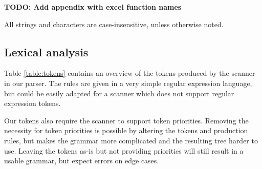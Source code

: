 \documentclass[conference]{IEEEtran}
\newcommand{\todo}[1]{\textbf{TODO: #1}}
\begin{document}
\todo{Add appendix with excel function names}

All strings and characters are case-insensitive, unless otherwise noted.

\subsection{Lexical analysis}

Table \ref{table:tokens} contains an overview of the tokens produced by the scanner in our parser. The rules are given in a very simple regular expression language, but could be easily adapted for a scanner which does not support regular expression tokens. 

Our tokens also require the scanner to support token priorities. Removing the necessity for token priorities is possible by altering the tokens and production rules, but makes the grammar more complicated and the resulting tree harder to use. Leaving the tokens as-is but not providing priorities will still result in a usable grammar, but expect errors on edge cases.
\end{document}
